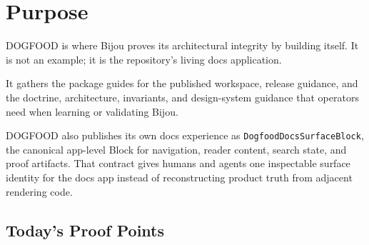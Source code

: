 \section{Purpose}\label{record-006-purpose}

DOGFOOD is where Bijou proves its architectural integrity by building itself. It is not an example; it is the repository's living docs application.

It gathers the package guides for the published workspace, release guidance, and the doctrine, architecture, invariants, and design-system guidance that operators need when learning or validating Bijou.

DOGFOOD also publishes its own docs experience as \texttt{D\allowbreak{}o\allowbreak{}g\allowbreak{}f\allowbreak{}o\allowbreak{}o\allowbreak{}d\allowbreak{}D\allowbreak{}o\allowbreak{}c\allowbreak{}s\allowbreak{}S\allowbreak{}u\allowbreak{}r\allowbreak{}f\allowbreak{}a\allowbreak{}c\allowbreak{}e\allowbreak{}B\allowbreak{}l\allowbreak{}o\allowbreak{}c\allowbreak{}k}, the canonical app-level Block for navigation, reader content, search state, and proof artifacts. That contract gives humans and agents one inspectable surface identity for the docs app instead of reconstructing product truth from adjacent rendering code.

\subsection{Today's Proof Points}\label{record-006-todays-proof-points}

